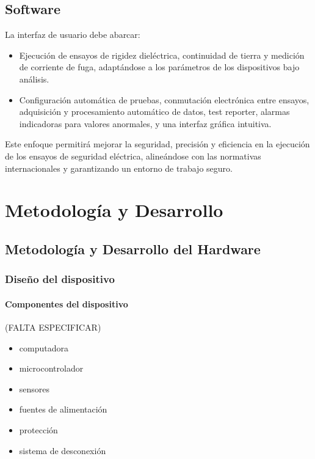 \documentclass[a4paper,12pt]{article}
\begin{document}
\subsection{Software}
La interfaz de usuario debe abarcar:

\begin{itemize}
    \item Ejecución de ensayos de rigidez dieléctrica, continuidad de tierra y medición de corriente de fuga, adaptándose a los parámetros de los dispositivos bajo análisis.
    \item Configuración automática de pruebas, conmutación electrónica entre ensayos, adquisición y procesamiento automático de datos, test reporter, alarmas indicadoras para valores anormales, y una interfaz gráfica intuitiva.
\end{itemize}

\noindent Este enfoque permitirá mejorar la seguridad, precisión y eficiencia en la ejecución de los ensayos de seguridad eléctrica, alineándose con las normativas internacionales y garantizando un entorno de trabajo seguro.

\section{Metodología y Desarrollo}

\subsection{Metodología y Desarrollo del Hardware}

\subsubsection{Diseño del dispositivo}

\paragraph{Componentes del dispositivo} (FALTA ESPECIFICAR)
\begin{itemize}
    \item computadora
    \item microcontrolador
    \item sensores
    \item fuentes de alimentación
    \item protección
    \item sistema de desconexión
\end{itemize}
\end{document}
